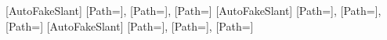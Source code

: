 \setCJKfallbackfamilyfont{\CJKrmdefault}[AutoFakeSlant]{
    [Path=\myfontdir]{\mycjkfallbackfontA},
    [Path=\myfontdir]{\mycjkfallbackfontB},
    [Path=\myfontdir]{\mycjkfallbackfontE}
}
\setCJKfallbackfamilyfont{\CJKsfdefault}[AutoFakeSlant]{
    [Path=\myfontdir]{\mycjkfallbackfontA},
    [Path=\myfontdir]{\mycjkfallbackfontB},
    [Path=\myfontdir]{\mycjkfallbackfontE}
}
\setCJKfallbackfamilyfont{\CJKttdefault}[AutoFakeSlant]{
    [Path=\myfontdir]{\mycjkfallbackfontA},
    [Path=\myfontdir]{\mycjkfallbackfontB},
    [Path=\myfontdir]{\mycjkfallbackfontE}
}
